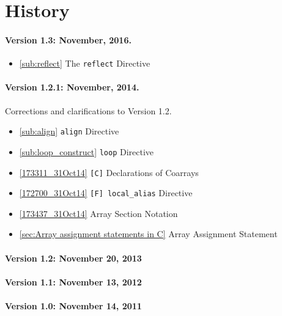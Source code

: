 \section*{History}

\paragraph*{Version 1.3: November, 2016.}

\begin{itemize}
  \item \ref{sub:reflect} The {\tt reflect} Directive
\end{itemize}


\paragraph*{Version 1.2.1: November, 2014.} Corrections and
clarifications to Version 1.2.

\begin{itemize}
  \item \ref{sub:align} {\tt align} Directive
  \item \ref{sub:loop_construct} {\tt loop} Directive
  \item \ref{173311_31Oct14} {\tt [C]} Declarations of Coarrays
  \item \ref{172700_31Oct14} {\tt [F] local\_alias} Directive
  \item \ref{173437_31Oct14} Array Section Notation
  \item \ref{sec:Array assignment statements in C} Array Assignment Statement
\end{itemize}

\paragraph*{Version 1.2: November 20, 2013}

\paragraph*{Version 1.1: November 13, 2012}

\paragraph*{Version 1.0: November 14, 2011}
